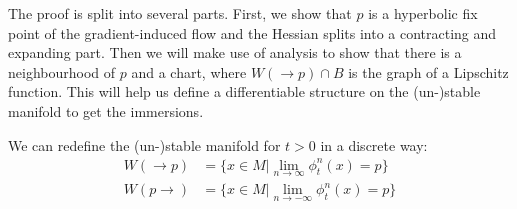 \begin{remark}
	The proof is split into several parts. First, we show that $p$ is a hyperbolic fix point of the gradient-induced flow and the Hessian splits into a contracting and expanding part. Then we will make use of analysis to show that there is a neighbourhood of $p$ and a chart, where $W(\to p)\cap B$ is the graph of a Lipschitz function. This will help us define a differentiable structure on the (un-)stable manifold to get the immersions. 
\end{remark}

\begin{remark} \label{rem: discrete system}
	We can redefine the (un-)stable manifold for $t>0$ in a discrete way:
	\begin{align*}
		W(\to p)&= \{x\in M| \lim_{n\to \infty} \phi_t^n(x)=p\}\\
		W(p\to)&= \{x\in M| \lim_{n\to -\infty} \phi_t^n(x)=p\}\\
	\end{align*}
\end{remark}


